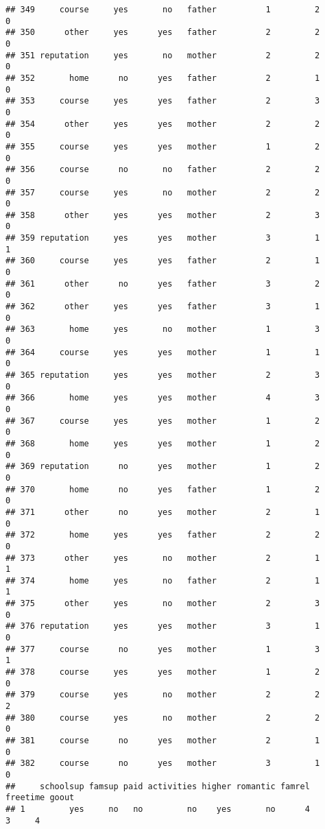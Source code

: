 \documentclass[]{article}
\begin{document}
\begin{verbatim}
## 349     course     yes       no   father          1         2        0
## 350      other     yes      yes   father          2         2        0
## 351 reputation     yes       no   mother          2         2        0
## 352       home      no      yes   father          2         1        0
## 353     course     yes      yes   father          2         3        0
## 354      other     yes      yes   mother          2         2        0
## 355     course     yes      yes   mother          1         2        0
## 356     course      no       no   father          2         2        0
## 357     course     yes       no   mother          2         2        0
## 358      other     yes      yes   mother          2         3        0
## 359 reputation     yes      yes   mother          3         1        1
## 360     course     yes      yes   father          2         1        0
## 361      other      no      yes   father          3         2        0
## 362      other     yes      yes   father          3         1        0
## 363       home     yes       no   mother          1         3        0
## 364     course     yes      yes   mother          1         1        0
## 365 reputation     yes      yes   mother          2         3        0
## 366       home     yes      yes   mother          4         3        0
## 367     course     yes      yes   mother          1         2        0
## 368       home     yes      yes   mother          1         2        0
## 369 reputation      no      yes   mother          1         2        0
## 370       home      no      yes   father          1         2        0
## 371      other      no      yes   mother          2         1        0
## 372       home     yes      yes   father          2         2        0
## 373      other     yes       no   mother          2         1        1
## 374       home     yes       no   father          2         1        1
## 375      other     yes       no   mother          2         3        0
## 376 reputation     yes      yes   mother          3         1        0
## 377     course      no      yes   mother          1         3        1
## 378     course     yes      yes   mother          1         2        0
## 379     course     yes       no   mother          2         2        2
## 380     course     yes       no   mother          2         2        0
## 381     course      no      yes   mother          2         1        0
## 382     course      no      yes   mother          3         1        0
##     schoolsup famsup paid activities higher romantic famrel freetime goout
## 1         yes     no   no         no    yes       no      4        3     4

\end{verbatim}
\end{document}
